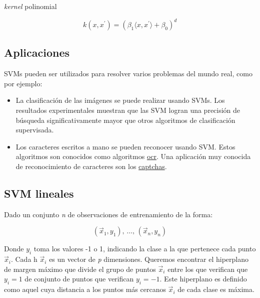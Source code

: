 \documentclass[12pt,spanish,a4paper]{article}
\numberwithin{equation}{section}
\begin{document}
\emph{kernel} polinomial

\begin{equation}
k\left(x, x^{\prime}\right) = \left(\beta_1 \langle x, x^{\prime}\rangle + \beta_0\right)^{d}
\end{equation}

\subsection{Aplicaciones}\label{aplicaciones}

SVMs pueden ser utilizados para resolver varios problemas del mundo
real, como por ejemplo:

\begin{itemize}
\item
  La clasificación de las imágenes se puede realizar usando SVMs. Los
  resultados experimentales muestran que las SVM logran una precisión de
  búsqueda significativamente mayor que otros algoritmos de
  clasificación supervisada.
\item
  Los caracteres escritos a mano se pueden reconocer usando SVM. Estos
  algoritmos son conocidos como algoritmos
  \href{https://en.wikipedia.org/wiki/Optical_character_recognition}{ocr}.
  Una aplicación muy conocida de reconocimiento de caracteres son los
  \href{https://en.wikipedia.org/wiki/CAPTCHA}{captchas}.
\end{itemize}

\subsection{SVM lineales}\label{svm-lineales}

Dado un conjunto \emph{n} de observaciones de entrenamiento de la forma:

\begin{equation}
({\vec {x}}_{1},y_{1}),\,\ldots ,\,({\vec {x}}_{n},y_{n})
\end{equation}

Donde \({\displaystyle y_{i}}\) toma los valores -1 o 1, indicando la
clase a la que pertenece cada punto \({\displaystyle {\vec {x}}_{i}}\).
Cada h \({\displaystyle {\vec {x}}_{i}}\) es un vector de \emph{p}
dimensiones. Queremos encontrar el hiperplano de margen máximo que
divide el grupo de puntos \({\displaystyle {\vec {x}}_{i}}\) entre los
que verifican que \({\displaystyle y_{i} = 1}\) de conjunto de puntos
que verifican \({\displaystyle y_{i} = -1}\). Este hiperplano es
definido como aquel cuya distancia a los puntos más cercanos
\({\displaystyle {\vec {x}}_{i}}\) de cada clase es máxima.
\end{document}
